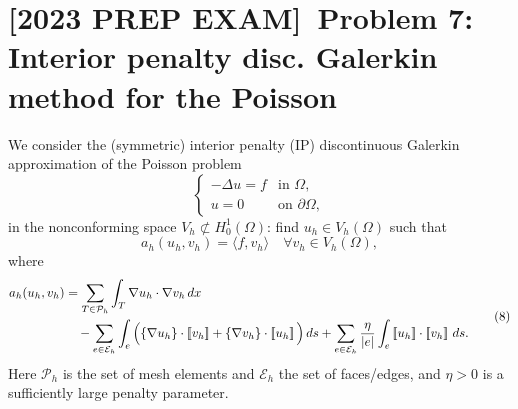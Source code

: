 \section*{[2023 PREP EXAM] Problem 7: Interior penalty disc. Galerkin method for the Poisson}
We consider the (symmetric) interior penalty (IP) discontinuous Galerkin
approximation of the Poisson problem
\[
    \begin{cases}
        - \Delta u = f & \text{in }\Omega,         \\
        u = 0          & \text{on }\partial\Omega,
    \end{cases}
\]
in the nonconforming space $V_h \not\subset H^1_0(\Omega)$:
find $u_h \in V_h(\Omega)$ such that
\[
    a_h(u_h,v_h) = \langle f,v_h\rangle
    \quad \forall v_h \in V_h(\Omega), \tag{7}
\]
where
\[
    \begin{aligned}
        a_h(u_h,v_h) & =
        \sum_{T\in \mathcal{P}_h} \int_T \nabla u_h \cdot \nabla v_h\,dx \\
                     & \quad - \sum_{e\in \mathcal{E}_h} \int_e
        \Big( \{\nabla u_h\}\cdot \jump{v_h} + \{\nabla v_h\}\cdot \jump{u_h} \Big)\,ds
        + \sum_{e\in \mathcal{E}_h} \frac{\eta}{|e|} \int_e \jump{u_h}\cdot \jump{v_h}\,ds.
    \end{aligned}\tag{8}
\]
Here $\mathcal{P}_h$ is the set of mesh elements and $\mathcal{E}_h$ the set of faces/edges,
and $\eta>0$ is a sufficiently large penalty parameter.
